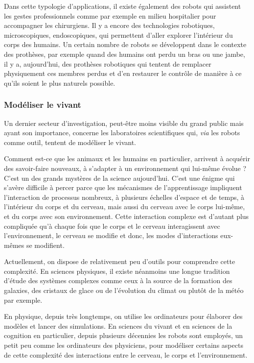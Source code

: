 Dans cette typologie d'applications, il existe également des robots qui assistent les gestes professionnels comme par exemple en milieu hospitalier pour accompagner les chirurgiens. Il y a encore des technologies robotiques, microscopiques, endoscopiques, qui permettent d'aller explorer l'intérieur du corps des humains. Un certain nombre de robots se développent dans le contexte des prothèses, par exemple quand des humains ont perdu un bras ou une jambe, il y a, aujourd'hui, des prothèses robotiques qui tentent de remplacer physiquement ces membres perdus et d'en restaurer le contrôle de manière à ce qu'ils soient le plus naturels possible. 

\subsubsection[Modéliser le vivant]{Modéliser le vivant}
\label{subsub:III.2.2.3}

Un dernier secteur d'investigation, peut-être moins visible du grand public mais ayant son importance, concerne les laboratoires scientifiques qui, \textit{via} les robots comme outil, tentent de modéliser le vivant.

Comment est-ce que les animaux et les humains en particulier, arrivent à acquérir des savoir-faire nouveaux, à s'adapter à un environnement qui lui-même évolue ? C'est un des grands mystères de la science aujourd'hui. C'est une énigme qui s'avère difficile à percer parce que les mécanismes de l'apprentissage impliquent l'interaction de processus nombreux, à plusieurs échelles d'espace et de temps, à l'intérieur du corps et du cerveau, mais aussi du cerveau avec le corps lui-même, et du corps avec son environnement. Cette interaction complexe est d'autant plus compliquée qu'à chaque fois que le corps et le cerveau interagissent avec l'environnement, le cerveau se modifie et donc, les modes d'interactions eux-mêmes se modifient. 

Actuellement, on dispose de relativement peu d'outils pour comprendre cette complexité. En sciences physiques, il existe néanmoins une longue tradition d'étude des systèmes complexes comme ceux à la source de la formation des galaxies, des cristaux de glace ou de l'évolution du climat ou plutôt de la météo par exemple. 

En physique, depuis très longtemps, on utilise les ordinateurs pour élaborer des modèles et lancer des simulations. En sciences du vivant et en sciences de la cognition en particulier, depuis plusieurs décennies les robots sont employés, un petit peu comme les ordinateurs des physiciens, pour modéliser certains aspects de cette complexité des interactions entre le cerveau, le corps et l'environnement. 

